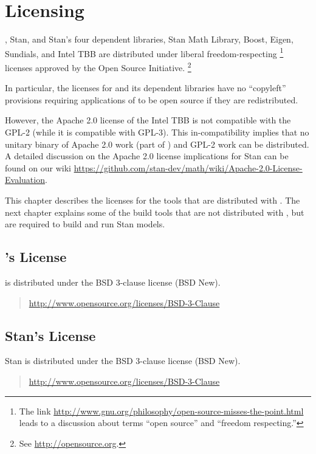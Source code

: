 \chapter{Licensing}\label{licensing.appendix}

\noindent
\CmdStan, Stan, and Stan's four dependent libraries, Stan Math
Library, Boost, Eigen, Sundials, and Intel TBB are distributed under
liberal freedom-respecting%
%
\footnote{The link
  \url{http://www.gnu.org/philosophy/open-source-misses-the-point.html}
  leads to a discussion about terms ``open
  source'' and ``freedom respecting.''}
%
licenses approved by the Open Source Initiative.%
\footnote{See \url{http://opensource.org}.}  

In particular, the licenses for \CmdStan and its dependent libraries
have no ``copyleft'' provisions requiring applications of \CmdStan to
be open source if they are redistributed.

However, the Apache 2.0 license of the Intel TBB is not compatible
with the GPL-2 (while it is compatible with GPL-3). This
in-compatibility implies that no unitary binary of Apache 2.0 work
(part of \CmdStan) and GPL-2 work can be distributed. A detailed
discussion on the Apache 2.0 license implications for Stan can be
found on our wiki
\url{https://github.com/stan-dev/math/wiki/Apache-2.0-License-Evaluation}.

This chapter describes the licenses for the tools that are distributed
with \CmdStan.  The next chapter explains some of the build tools that
are not distributed with \CmdStan, but are required to build and run
Stan models.

\section{\CmdStan's License}

\CmdStan is distributed under the BSD 3-clause license (BSD New).
%
\begin{quote}
\url{http://www.opensource.org/licenses/BSD-3-Clause}
\end{quote}

\section{Stan's License}

Stan is distributed under the BSD 3-clause license (BSD New).
%
\begin{quote}
\url{http://www.opensource.org/licenses/BSD-3-Clause}
\end{quote}

